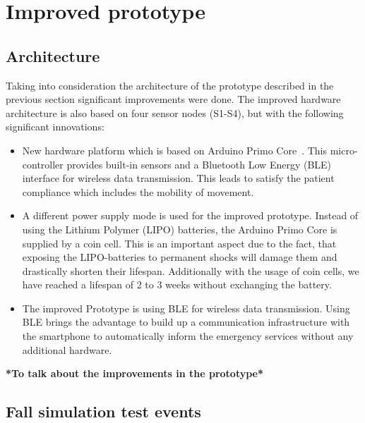 \documentclass[conference]{IEEEtran}
\theoremstyle{definition}
\begin{document}
\section{Improved prototype}
\label{sec:improvedprototype}

\subsection{Architecture}
\label{sub:improvedprototypearchitecture}

Taking into consideration the architecture of the prototype described in the previous 
section significant improvements were done. The improved hardware architecture is also 
based on four sensor nodes (S1-S4), but with the following significant innovations:

\begin{itemize}
 \item New hardware platform which is based on Arduino Primo Core~\cite{Arduino2018}. 
 This micro-controller provides built-in sensors and a Bluetooth Low Energy (BLE) 
 interface for wireless data transmission. This leads to satisfy the patient compliance
 which includes the mobility of movement.
 \item A different power supply mode is used for the improved prototype. Instead of 
 using the Lithium Polymer (LIPO) batteries, the Arduino Primo Core is supplied by a 
 coin cell. This is an important aspect due to the fact, that exposing the LIPO-batteries 
 to permanent shocks will damage them and drastically shorten their lifespan. 
 Additionally with the usage of coin cells, we have reached a lifespan of 2 to 3 weeks 
 without exchanging the battery.
 \item The improved Prototype is using BLE for wireless data transmission. Using BLE 
 brings the advantage to build up a communication infrastructure with the smartphone 
 to automatically inform the emergency services without any additional hardware.
\end{itemize}

\textbf{*To talk about the improvements in the prototype*}

\subsection{Fall simulation test events} %
\end{document}
